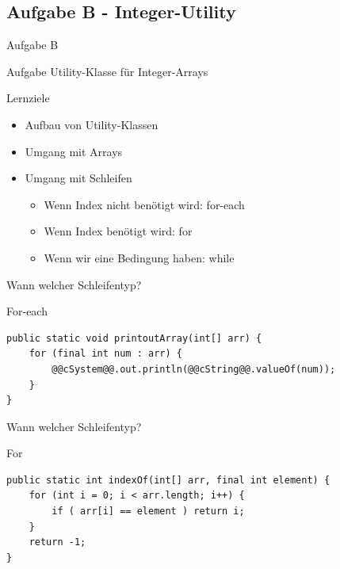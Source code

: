 \documentclass[aspectratio=169]{beamer}
\begin{document}
\subsection{Aufgabe B - Integer-Utility}

\begin{frame}{Aufgabe B}
  \begin{block}{Aufgabe}
    \pause
    Utility-Klasse für Integer-Arrays
  \end{block}

  \pause
  \begin{block}{Lernziele}
    \begin{itemize}
      \item Aufbau von Utility-Klassen
      \pause
      \item Umgang mit Arrays
      \pause
      \item Umgang mit Schleifen \begin{itemize}
        \pause
        \item Wenn Index \color{alertcolor}nicht \color{FGround}benötigt wird: \color{keywordcolor}for-each\color{FGround}
        \pause
        \item Wenn Index benötigt wird: \color{keywordcolor}for\color{FGround}
        \pause
        \item Wenn wir eine Bedingung haben: \color{keywordcolor}while\color{FGround}
      \end{itemize}
    \end{itemize}
  \end{block}
\end{frame}

\begin{frame}[fragile]{Wann welcher Schleifentyp?}
  \begin{exampleblock}{For-each}
    \begin{lstlisting}
public static void printoutArray(int[] arr) {
    for (final int num : arr) {
        @@cSystem@@.out.println(@@cString@@.valueOf(num));
    }
}
    \end{lstlisting}
  \end{exampleblock}
\end{frame}

\begin{frame}[fragile]{Wann welcher Schleifentyp?}
  \begin{exampleblock}{For}
    \begin{lstlisting}
public static int indexOf(int[] arr, final int element) {
    for (int i = 0; i < arr.length; i++) {
        if ( arr[i] == element ) return i;
    }
    return -1;
}
    \end{lstlisting}
  \end{exampleblock}
\end{frame}
\end{document}
